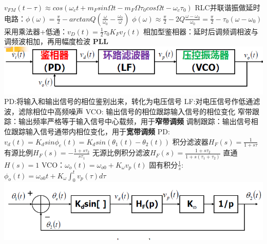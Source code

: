 \documentclass[10.5pt,landscape]{article}
\begin{document}
\begin{multicols*}{4}
 $v_{FM}(t - \tau) \approx cos(\omega_c t + m_F sin \Omega t - m_F \Omega \tau_0 cos\Omega t - \omega_c \tau_0)$ \newline
  RLC并联谐振做延时电路：$\phi(\omega) = \frac{\pi}{2} - arctan Q(\frac{\omega}{\omega_0} - \frac{\omega_0}{\omega})$\newline
  $\phi(\omega) \approx \frac{\pi}{2} - 2Q\frac{\omega - \omega_0}{\omega_0} = \frac{\pi}{2} - \tau_0(\omega - \omega_0)$\newline
  采用乘法器+低通：$v_D(t) = \frac{1}{2}\tau_0 K_F v_f(t)$ \newline
  相加型鉴相器：延时后调频调相波与调频波相加，再用幅度检波 \newline 
  \textbf{PLL}\newline
    \includegraphics[scale=0.4]{PLL}\newline
  PD:将输入和输出信号的相位鉴别出来，转化为电压信号 \newline
  LF:对电压信号作低通滤波，滤除相位中高频噪声\newline
  VCO: 输出信号的相位跟踪输入信号的相位变化 \newline
  窄带跟踪：输出频率严格等于输入信号中心载频，用于\textbf{窄带调频} \newline
  调制跟踪：输出信号相位跟踪输入信号通带内相位变化，用于\textbf{宽带调频} \newline
  PD:$v_d(t) = K_d sin \phi_e(t) = K_d sin (\theta_1(t) - \theta_2(t)) $ \newline
  积分滤波器$H_F(s) = \frac{1}{1 + s\tau}$ 有源比例$H_F(s) = -\frac{1 + s\tau_2}{s\tau_1}$ \newline
  无源比例积分滤波$H_F(s) = \frac{1 + s\tau_2}{1 + s(\tau_1 + \tau_2)}$ 直通 $H(s) = 1$ \newline
  VCO：$\omega_o(t) = \omega_{o0} + K_\omega v_p(t)$ \newline
  固有积分$\frac{1}{s}$: $\phi_o(t) = \omega_{o0}t + K_\omega \int_{0}^{t}v_p(\tau)d\tau$ \newline
   \includegraphics[scale=0.4]{PLL数学}\newline

\end{multicols*}
\end{document}
